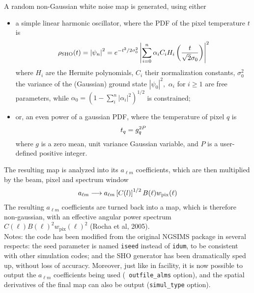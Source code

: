 \begin{codedescription}
{%
A random non-Gaussian white noise map is generated, using either
\begin{itemize}
%
\item a simple linear harmonic oscillator, where the PDF of the pixel
temperature $t$ is
	\begin{eqnarray}
	\rho_{\rm SHO}(t) = \left| \psi_n\right|^2 = e^{-t^2/2\sigma_0^2} \left|\sum_{i=0}^{n} \alpha_i
C_i H_i \left(\frac{t}{\sqrt{2}\sigma_0}\right)\right|^2 \label{eq:nongauss_sho}
	\end{eqnarray}
where $H_i$ are the Hermite polynomials, $C_i$ their normalization constants,
$\sigma_0^2$ the variance of the (Gaussian) ground state $\left|\psi_0\right|^2,$
$\alpha_i$ for $i\ge 1$ are free parameters, while $\alpha_0 =
\left(1 - \sum_i^n |\alpha_i|^2\right)^{1/2}$ is constrained;
%
\item or, an even power of a gaussian PDF, where the temperature of pixel $q$ is
	\begin{eqnarray}
	t_q = g_q^{2 P} \label{eq:nongauss_powgauss}
	\end{eqnarray}
where $g$ is a zero mean, unit variance Gaussian variable, and $P$ is
a user-defined positive integer.
\end{itemize}
The resulting map is analyzed into its $a_{\ell m}$ coefficients, which are then
multiplied by the beam, pixel and spectrum window
\begin{eqnarray}
	a_{\ell m} \longrightarrow a_{\ell m} \left[C(l)\right]^{1/2} B(\ell) w_{\rm pix}(\ell) \nonumber
\end{eqnarray}
The resulting $a_{\ell m}$ coefficients are turned back into a map, which is
therefore non-gaussian, with an effective angular power spectrum $C(\ell) B(\ell)^2
w_{\mathrm{pix}}(\ell)^2$ (Rocha et al, 2005).
\\
Notes: the code has been modified from the original NGSIMS package in several
respects:
the seed parameter is named {\tt iseed} instead of {\tt idum}, to be consistent
with other \healpix simulation codes; and the SHO generator has been
dramatically sped up, without loss of accuracy. Moreover, just like in  facility,
it is now possible to output the $a_{\ell m}$ coefficients being used ({\tt
outfile\_alms} option), and the spatial derivatives of the final map can also be
output ({\tt simul\_type} option).
}
\end{codedescription}


